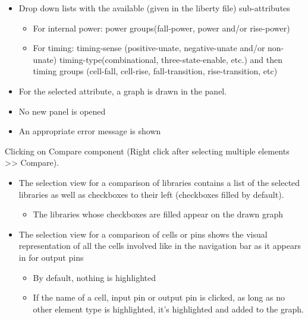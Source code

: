 \documentclass[10pt,a4paper]{report}
\begin{document}
\begin{FR}
{\begin{itemize}
\begin{itemize}
                \item For input pins: internal power
                \item For output pins: internal power and timing
            \end{itemize}
            \item Drop down lists with the available (given in the liberty file) sub-attributes
            \begin{itemize}
                \item For internal power: power groups(fall-power, power and/or rise-power)
                \item For timing: timing-sense (positive-unate, negative-unate and/or non-unate) timing-type(combinational, three-state-enable, etc.) and then timing groups (cell-fall, cell-rise, fall-transition, rise-transition, etc)
            \end{itemize}
            \item For the selected attribute, a graph is drawn in the panel.
        \end{itemize}}
    {\begin{itemize}
        \item No new panel is opened
        \item An appropriate error message is shown
    \end{itemize}}
    {Clicking on Compare component (Right click after selecting multiple elements >> Compare).}
    {\begin{itemize}
        \item The selection view for a comparison of libraries contains a list of the selected libraries as well as checkboxes to their left (checkboxes filled by default).
        \begin{itemize}
            \item The libraries whose checkboxes are filled appear on the drawn graph
        \end{itemize}
        \item The selection view for a comparison of cells or pins shows the visual representation of all the cells involved like in the navigation bar as it appears in \label{FR-Display of pins} for output pins
        \begin{itemize}
            \item By default, nothing is highlighted
            \item If the name of a cell, input pin or output pin is clicked, as long as no other element type is highlighted, it's highlighted and added to the graph.

\end{itemize}
\end{itemize}}
\end{FR}
\end{document}
